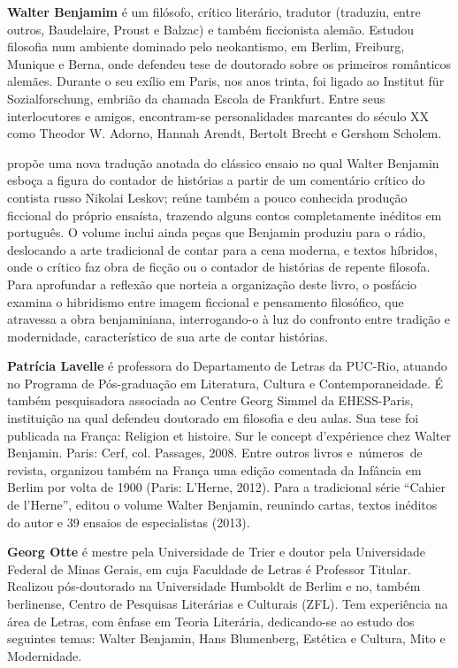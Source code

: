 
\textbf{Walter Benjamim} é um filósofo, crítico literário, tradutor (traduziu, entre outros, Baudelaire, Proust e Balzac) e também ficcionista alemão. Estudou filosofia num ambiente dominado pelo neokantismo, em Berlim, Freiburg, Munique e Berna, onde defendeu tese de doutorado sobre os primeiros românticos alemães. Durante o seu exílio em Paris, nos anos trinta, foi ligado ao Institut für Sozialforschung, embrião da chamada Escola de Frankfurt. Entre seus interlocutores e amigos, encontram-se personalidades marcantes do século XX como Theodor W. Adorno, Hannah Arendt, Bertolt Brecht e Gershom Scholem.

\textbf{\titulo} propõe uma nova tradução anotada do clássico ensaio no qual Walter Benjamin esboça a figura do contador de histórias a partir de um comentário crítico do contista russo Nikolai Leskov; reúne também a pouco conhecida produção ficcional do próprio ensaísta, trazendo alguns contos completamente inéditos em português. O volume inclui ainda peças que Benjamin produziu para o rádio, deslocando a arte tradicional de contar para a cena moderna, e textos híbridos, onde o crítico faz obra de ficção ou o contador de histórias de repente filosofa. Para aprofundar a reflexão que norteia a organização deste livro, o posfácio examina o hibridismo entre imagem ficcional e pensamento filosófico, que atravessa a obra benjaminiana, interrogando-o à luz do confronto entre tradição e modernidade, característico de sua arte de contar histórias.

\textbf{Patrícia Lavelle} é professora do Departamento de Letras da PUC-Rio, atuando no Programa de Pós-graduação em Literatura, Cultura e Contemporaneidade. É também pesquisadora associada ao Centre Georg Simmel da EHESS-Paris,  instituição na qual defendeu doutorado em filosofia e deu aulas. Sua tese foi publicada na França: Religion et histoire. Sur le concept d’expérience chez Walter Benjamin. Paris: Cerf, col. Passages, 2008. Entre outros livros e números de revista, organizou também na França uma edição comentada da Infância em Berlim por volta de 1900 (Paris: L’Herne, 2012). Para a tradicional série “Cahier de l’Herne”, editou o volume Walter Benjamin, reunindo cartas, textos inéditos do autor e 39 ensaios de especialistas (2013). 

\textbf{Georg Otte} é mestre pela Universidade de Trier e doutor pela Universidade Federal de Minas Gerais, em cuja Faculdade de Letras é Professor Titular. Realizou pós-doutorado na Universidade Humboldt de Berlim e no, também berlinense, Centro de Pesquisas Literárias e Culturais (ZFL). Tem experiência na área de Letras, com ênfase em Teoria Literária, dedicando-se ao estudo dos seguintes temas: Walter Benjamin, Hans Blumenberg, Estética e Cultura, Mito e Modernidade.

